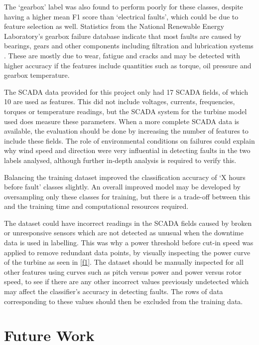 The `gearbox' label was also found to perform poorly for these classes,
despite having a higher mean F1 score than `electrical faults', which could be
due to feature selection as well. Statistics from the National Renewable
Energy Laboratory's gearbox failure database indicate that most faults are
caused by bearings, gears and other components including filtration and
lubrication systems \cite{Stati15}. These are mostly due to wear, fatigue and
cracks \cite{Sheng11} and may be detected with higher accuracy if the features
include quantities such as torque, oil pressure and gearbox temperature.

The SCADA data provided for this project only had 17 SCADA fields, of which 10
are used as features. This did not include voltages, currents, frequencies,
torques or temperature readings, but the SCADA system for the turbine model
used does measure these parameters. When a more complete SCADA data is
available, the evaluation should be done by increasing the number of features
to include these fields. The role of environmental conditions on failures
could explain why wind speed and direction were very influential in detecting
faults in the two labels analysed, although further in-depth analysis is
required to verify this.

Balancing the training dataset improved the classification accuracy of `X
hours before fault' classes slightly. An overall improved model may be
developed by oversampling only these classes for training, but there is a
trade-off between this and the training time and computational resources
required.

The dataset could have incorrect readings in the SCADA fields caused by broken
or unresponsive sensors which are not detected as unusual when the downtime
data is used in labelling. This was why a power threshold before cut-in speed
was applied to remove redundant data points, by visually inspecting the power
curve of the turbine as seen in \autoref{f1}. The dataset should be manually
inspected for all other features using curves such as pitch versus power and
power versus rotor speed, to see if there are any other incorrect values
previously undetected which may affect the classifier's accuracy in detecting
faults. The rows of data corresponding to these values should then be excluded
from the training data.

\section{Future Work}

